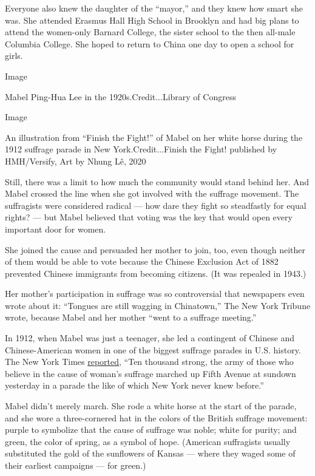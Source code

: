Everyone also knew the daughter of the ``mayor,'' and they knew how
smart she was. She attended Erasmus Hall High School in Brooklyn and had
big plans to attend the women-only Barnard College, the sister school to
the then all-male Columbia College. She hoped to return to China one day
to open a school for girls.

Image

Mabel Ping-Hua Lee in the 1920s.Credit...Library of Congress

Image

An illustration from ``Finish the Fight!'' of Mabel on her white horse
during the 1912 suffrage parade in New York.Credit...Finish the Fight!
published by HMH/Versify, Art by Nhung Lê, 2020

Still, there was a limit to how much the community would stand behind
her. And Mabel crossed the line when she got involved with the suffrage
movement. The suffragists were considered radical --- how dare they
fight so steadfastly for equal rights? --- but Mabel believed that
voting was the key that would open every important door for women.

She joined the cause and persuaded her mother to join, too, even though
neither of them would be able to vote because the Chinese Exclusion Act
of 1882 prevented Chinese immigrants from becoming citizens. (It was
repealed in 1943.)

Her mother's participation in suffrage was so controversial that
newspapers even wrote about it: ``Tongues are still wagging in
Chinatown,'' The New York Tribune wrote, because Mabel and her mother
``went to a suffrage meeting.''

In 1912, when Mabel was just a teenager, she led a contingent of Chinese
and Chinese-American women in one of the biggest suffrage parades in
U.S. history. The New York Times
\href{https://timesmachine.nytimes.com/timesmachine/1912/05/05/100533097.html?pageNumber=1}{reported},
``Ten thousand strong, the army of those who believe in the cause of
woman's suffrage marched up Fifth Avenue at sundown yesterday in a
parade the like of which New York never knew before.''

Mabel didn't merely march. She rode a white horse at the start of the
parade, and she wore a three-cornered hat in the colors of the British
suffrage movement: purple to symbolize that the cause of suffrage was
noble; white for purity; and green, the color of spring, as a symbol of
hope. (American suffragists usually substituted the gold of the
sunflowers of Kansas --- where they waged some of their earliest
campaigns --- for green.)

